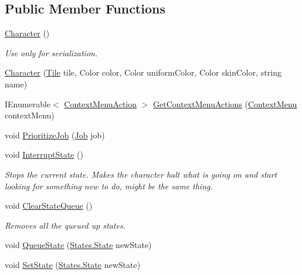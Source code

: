 \subsection*{Public Member Functions}
\begin{DoxyCompactItemize}
\item 
\hyperlink{class_project_porcupine_1_1_entities_1_1_character_a8db8c2f16e32a09749adf9e14eb6f952}{Character} ()
\begin{DoxyCompactList}\small\item\em Use only for serialization. \end{DoxyCompactList}\item 
\hyperlink{class_project_porcupine_1_1_entities_1_1_character_a470d1d6a44a287c92da31e61c610fb19}{Character} (\hyperlink{class_tile}{Tile} tile, Color color, Color uniform\+Color, Color skin\+Color, string name)
\item 
I\+Enumerable$<$ \hyperlink{class_context_menu_action}{Context\+Menu\+Action} $>$ \hyperlink{class_project_porcupine_1_1_entities_1_1_character_a57c4c3ef718c8e08d8c9c06df4a3b3f9}{Get\+Context\+Menu\+Actions} (\hyperlink{class_context_menu}{Context\+Menu} context\+Menu)
\item 
void \hyperlink{class_project_porcupine_1_1_entities_1_1_character_aef25ac994da838be626b8e364ba307c9}{Prioritize\+Job} (\hyperlink{class_job}{Job} job)
\item 
void \hyperlink{class_project_porcupine_1_1_entities_1_1_character_a8d7ae19ccf3405f0819149a6e5821fc2}{Interrupt\+State} ()
\begin{DoxyCompactList}\small\item\em Stops the current state. Makes the character halt what is going on and start looking for something new to do, might be the same thing. \end{DoxyCompactList}\item 
void \hyperlink{class_project_porcupine_1_1_entities_1_1_character_a129b77bcac4c2dd9c8516b5f20162001}{Clear\+State\+Queue} ()
\begin{DoxyCompactList}\small\item\em Removes all the queued up states. \end{DoxyCompactList}\item 
void \hyperlink{class_project_porcupine_1_1_entities_1_1_character_a71dca9d60d0fa118d79f4438f40ef542}{Queue\+State} (\hyperlink{class_project_porcupine_1_1_entities_1_1_states_1_1_state}{States.\+State} new\+State)
\item 
void \hyperlink{class_project_porcupine_1_1_entities_1_1_character_af2e44de8914b84282ad1e476720f5606}{Set\+State} (\hyperlink{class_project_porcupine_1_1_entities_1_1_states_1_1_state}{States.\+State} new\+State)

\end{DoxyCompactItemize}
